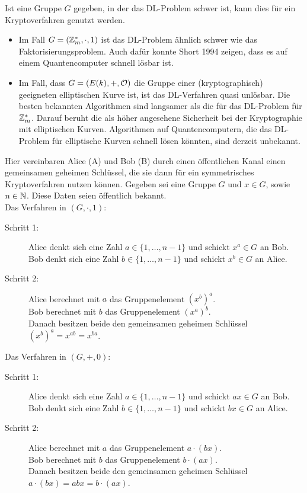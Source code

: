 \begin{bem}
	Ist eine Gruppe $G$ gegeben, in der das DL-Problem schwer ist, kann dies für ein Kryptoverfahren genutzt werden.\begin{itemize}
		\item Im Fall $G = (\mathbb{Z}_m^*,\cdot,1)$ ist das DL-Problem ähnlich schwer wie das Faktorisierungsproblem. 
		Auch dafür konnte Short 1994 zeigen, dass es auf einem Quantencomputer schnell lösbar ist.
		\item Im Fall, dass $G = (E(k),+,\mathcal{O})$ die Gruppe einer (kryptographisch) geeigneten elliptischen Kurve ist, ist das DL-Verfahren quasi unlösbar. 
		Die besten bekannten Algorithmen sind langsamer als die für das DL-Problem für $\mathbb{Z}_m^*$. 
		Darauf beruht die als höher angesehene Sicherheit bei der Kryptographie mit elliptischen Kurven. 
		Algorithmen auf Quantencomputern, die das DL-Problem für elliptische Kurven schnell lösen könnten, sind derzeit unbekannt.
	\end{itemize}
\end{bem}

\begin{anw}
	Hier vereinbaren Alice (A) und Bob (B) durch einen öffentlichen Kanal einen gemeinsamen geheimen Schlüssel, die sie dann für ein symmetrisches Kryptoverfahren nutzen können. 
	Gegeben sei eine Gruppe $G$ und $x \in G$, sowie $n \in \mathbb{N}$. 
	Diese Daten seien öffentlich bekannt. \\
	Das Verfahren in $(G,\cdot,1)$:
	\begin{description}
		\item[Schritt 1:] Alice denkt sich eine Zahl $a \in \{1,\dots,n-1\}$ und schickt $x^a \in G$ an Bob.\\
		Bob denkt sich eine Zahl $b \in \{1,\dots,n-1\}$ und schickt $x^b \in G$ an Alice.
		\item[Schritt 2:] Alice berechnet mit $a$ das Gruppenelement $(x^b)^a$. \\
		Bob berechnet mit $b$ das Gruppenelement $(x^a)^b$. \\
		Danach besitzen beide den gemeinsamen geheimen Schlüssel $(x^b)^a = x^{ab} = x^{ba}$.
	\end{description}
	Das Verfahren in $(G,+,0)$:
	\begin{description}
		\item[Schritt 1:] Alice denkt sich eine Zahl $a \in \{1,\dots,n-1\}$ und schickt $ax \in G$ an Bob.\\
		Bob denkt sich eine Zahl $b \in \{1,\dots,n-1\}$ und schickt $bx \in G$ an Alice.
		\item[Schritt 2:] Alice berechnet mit $a$ das Gruppenelement $a\cdot(bx)$. \\
		Bob berechnet mit $b$ das Gruppenelement $b\cdot(ax)$. \\
		Danach besitzen beide den gemeinsamen geheimen Schlüssel $a\cdot(bx) = abx = b\cdot(ax)$.
	\end{description}
\end{anw}

